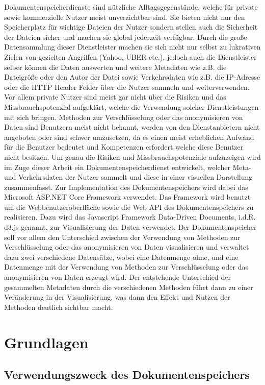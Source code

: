 \documentclass[
    fontsize=12pt,
    headings=small,
    parskip=half,           %
    bibliography=totoc,
    numbers=noenddot,       %
    open=any,               %
    ]{scrreprt}
\begin{document}
Dokumentenspeicherdienste sind nützliche Alltagsgegenstände, welche für private sowie kommerzielle Nutzer meist unverzichtbar sind. 
Sie bieten nicht nur den Speicherplatz für wichtige Dateien der Nutzer sondern stellen auch die Sicherheit der Dateien sicher und machen sie global jederzeit verfügbar. 
Durch die große Datensammlung dieser Dienstleister machen sie sich nicht nur selbst zu lukrativen Zielen von gezielten Angriffen (Yahoo, UBER etc.), jedoch auch die Dienstleister selber können die Daten auswerten und weitere Metadaten wie z.B. die Dateigröße oder den Autor der Datei sowie Verkehrsdaten wie z.B. die IP-Adresse oder die HTTP Header Felder über die Nutzer sammeln und weiterverwenden. 
Vor allem private Nutzer sind meist gar nicht über die Risiken und das Missbrauchspotenzial aufgeklärt, welche die Verwendung solcher Dienstleistungen mit sich bringen. 
Methoden zur Verschlüsselung oder das anonymisieren von Daten sind Benutzern meist nicht bekannt, werden von den Dienstanbietern nicht angeboten oder sind schwer umzusetzen, da es einen meist erheblichen Aufwand für die Benutzer bedeutet und Kompetenzen erfordert welche diese Benutzer nicht besitzen. 
Um genau die Risiken und Missbrauchspotenziale aufzuzeigen wird im Zuge dieser Arbeit ein Dokumentenspeicherdienst entwickelt, welcher Meta- und Verkehrsdaten der Nutzer sammelt und diese in einer visuellen Darstellung zusammenfasst. 
Zur Implementation des Dokumentenspeichers wird dabei das Microsoft ASP.NET Core Framework verwendet. 
Das Framework wird benutzt um die Webbenutzeroberfläche sowie die Web API des Dokumentenspeichers zu realisieren. 
Dazu wird das Javascript Framework Data-Driven Documents, i.d.R. d3.js genannt, zur Visualisierung der Daten verwendet. 
Der Dokumentenspeicher soll vor allem den Unterschied zwischen der Verwendung von Methoden zur Verschlüsselung oder das anonymisieren von Daten visualisieren und verwaltet dazu zwei verschiedene Datensätze, wobei eine Datenmenge ohne, und eine Datenmenge mit der Verwendung von Methoden zur Verschlüsselung oder das anonymisieren von Daten erzeugt wird. Der entstehende Unterschied der gesammelten Metadaten durch die verschiedenen Methoden führt dann zu einer Veränderung in der Visualisierung, was dann den Effekt und Nutzen der Methoden deutlich sichtbar macht.  

\chapter{Grundlagen}

    \section{Verwendungszweck des Dokumentenspeichers} 
\end{document}
